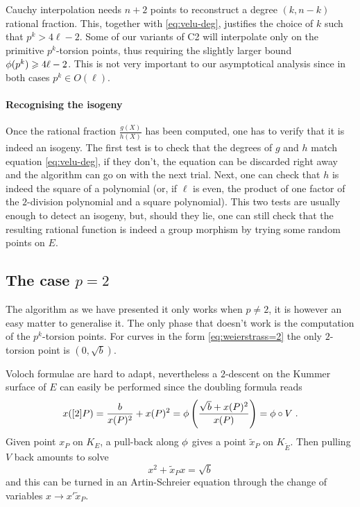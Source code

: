 Cauchy interpolation needs $n+2$ points to reconstruct a degree
$(k,n-k)$ rational fraction. This, together with \eqref{eq:velu-deg},
justifies the choice of $k$ such that $p^k > 4\ell - 2$. Some of our
variants of C2 will interpolate only on the primitive $p^k$-torsion
points, thus requiring the slightly larger bound $\phi(p^k) \geqslant
4\ell - 2$. This is not very important to our asymptotical analysis
since in both cases $p^k \in O(\ell)$.

\paragraph{Recognising the isogeny}
Once the rational fraction $\frac{g(X)}{h(X)}$ has been computed, one
has to verify that it is indeed an isogeny. The first test is to check
that the degrees of $g$ and $h$ match equation \eqref{eq:velu-deg}, if
they don't, the equation can be discarded right away and the algorithm
can go on with the next trial. Next, one can check that $h$ is indeed
the square of a polynomial (or, if $\ell$ is even, the product of one
factor of the $2$-division polynomial and a square polynomial). This
two tests are usually enough to detect an isogeny, but, should they
lie, one can still check that the resulting rational function is
indeed a group morphism by trying some random points on $E$.


\subsection{The case $p=2$}
\label{sec:p=2}
The algorithm as we have presented it only works when $p\ne2$, it is
however an easy matter to generalise it. The only phase that doesn't
work is the computation of the $p^k$-torsion points. For curves in the
form \eqref{eq:weierstrass=2} the only $2$-torsion point is
$(0,\sqrt{b})$.

Voloch formulae are hard to adapt, nevertheless a $2$-descent on the
Kummer surface of $E$ can easily be performed since the doubling
formula reads
\begin{equation}
  x([2]P) = \frac{b}{x(P)^2} + x(P)^2 =
  \phi\left(\frac{\sqrt{b} + x(P)^2}{x(P)} \right) = \phi\circ V
  \;\text{.}
\end{equation}
Given point $x_P$ on $K_E$, a pull-back along $\phi$ gives a
point $\tilde{x}_P$ on $K_{\widetilde{E}}$. Then pulling $V$ back
amounts to solve
\begin{equation}
  \label{eq:2-descent}
  x^2 + \tilde{x}_Px = \sqrt{b}
\end{equation}
and this can be turned in an Artin-Schreier equation through the
change of variables $x \rightarrow x'\tilde{x}_P$.


